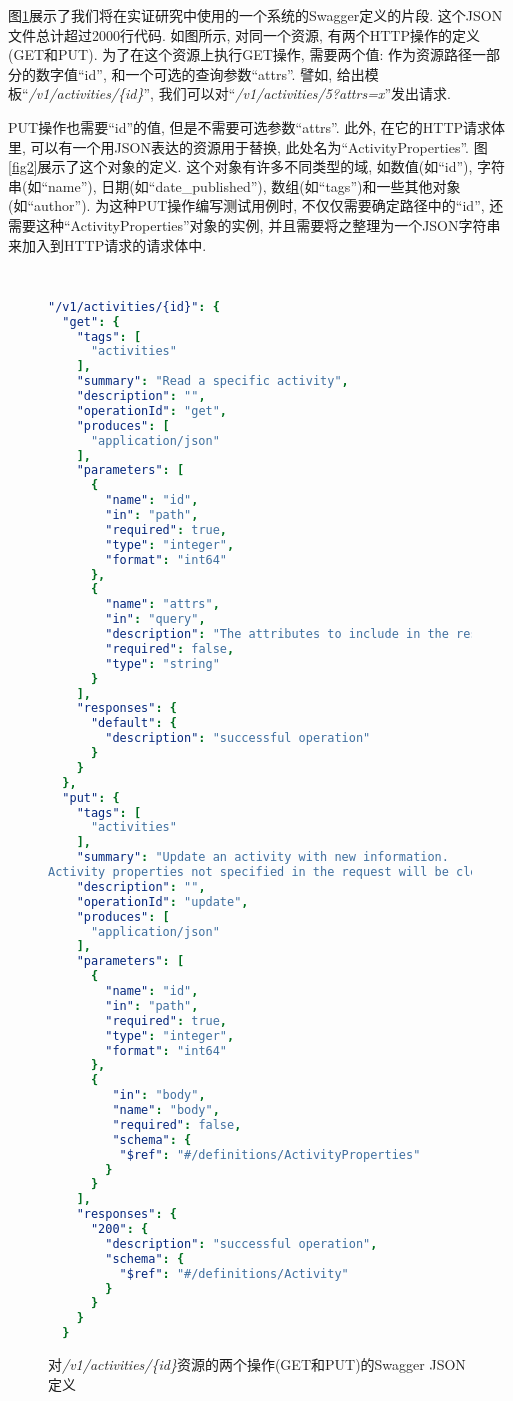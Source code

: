     图\ref{fig1}展示了我们将在实证研究中使用的一个系统的Swagger定义的片段. 这个JSON文件总计超过2000行代码. 如图所示, 对同一个资源, 有两个HTTP操作的定义(GET和PUT). 为了在这个资源上执行GET操作, 需要两个值: 作为资源路径一部分的数字值“id”, 和一个可选的查询参数“attrs”. 譬如, 给出模板“\textit{/v1/activities/\{id\}}”, 我们可以对“\textit{/v1/activities/5?attrs=x}”发出请求. 
    
    PUT操作也需要“id”的值, 但是不需要可选参数“attrs”. 此外, 在它的HTTP请求体里, 可以有一个用JSON表达的资源用于替换, 此处名为“ActivityProperties”. 图\ref{fig2}展示了这个对象的定义. 这个对象有许多不同类型的域, 如数值(如“id”), 字符串(如“name”), 日期(如“date\_published”), 数组(如“tags”)和一些其他对象(如“author”). 为这种PUT操作编写测试用例时, 不仅仅需要确定路径中的“id”, 还需要这种“ActivityProperties”对象的实例, 并且需要将之整理为一个JSON字符串来加入到HTTP请求的请求体中. 
    
    \begin{figure}
      {
      \tt
        \scriptsize
      \begin{lstlisting}[language=yaml]
"/v1/activities/{id}": { 
  "get": {
    "tags": [ 
      "activities"
    ],
    "summary": "Read a specific activity", 
    "description": "",
    "operationId": "get",
    "produces": [
      "application/json" 
    ],
    "parameters": [ 
      {
        "name": "id", 
        "in": "path", 
        "required": true, 
        "type": "integer", 
        "format": "int64"
      }, 
      {
        "name": "attrs",
        "in": "query",
        "description": "The attributes to include in the response. Comma-separated list.", 
        "required": false,
        "type": "string" 
      }
    ], 
    "responses": {
      "default": {
        "description": "successful operation"
      } 
    }
  }, 
  "put": {
    "tags": [ 
      "activities"
    ],
    "summary": "Update an activity with new information.
Activity properties not specified in the request will be cleared.", 
    "description": "", 
    "operationId": "update", 
    "produces": [
      "application/json" 
    ],
    "parameters": [ 
      {
        "name": "id", 
        "in": "path", 
        "required": true, 
        "type": "integer", 
        "format": "int64"
      }, 
      {
         "in": "body", 
         "name": "body", 
         "required": false, 
         "schema": {
          "$ref": "#/definitions/ActivityProperties"
        }
      }
    ],
    "responses": {
      "200": {
        "description": "successful operation",
        "schema": {
          "$ref": "#/definitions/Activity"
        }
      }
    }
  }
        \end{lstlisting}
        }
      \caption{对\textit{/v1/activities/\{id\}}资源的两个操作(GET和PUT)的Swagger JSON定义}
        \label{fig1}
    \end{figure}
    
